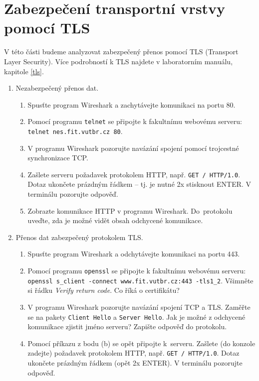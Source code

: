 \documentclass[a4paper,11pt]{article}
\begin{document}
\section{Zabezpečení transportní vrstvy pomocí TLS}
V této části budeme analyzovat zabezpečený přenos pomocí TLS (Transport Layer Security). Více podrobností k TLS najdete v laboratorním manuálu, kapitole \ref{tls}. 
\begin{enumerate}
  \item Nezabezpečený přenos dat.
    \begin{enumerate}
      \item Spusťte program Wireshark a zachytávejte komunikaci na portu 80.
      \item Pomocí programu {\tt telnet} se připojte k fakultnímu webovému
        serveru: \\ \verb|telnet nes.fit.vutbr.cz 80|.
      \item V programu Wireshark pozorujte navázání spojení pomocí trojcestné synchronizace TCP.
      \item Zašlete serveru požadavek protokolem HTTP, např. \verb|GET / HTTP/1.0|. Dotaz ukončete prázdným řádkem -- tj. je nutné 2x stisknout ENTER. V terminálu pozorujte odpověď.
      \item Zobrazte komunikace HTTP v programu Wireshark.  Do~protokolu uveďte, zda je možné vidět obsah odchycené komunikace.
    \end{enumerate}

  \item Přenos dat zabezpečený protokolem TLS.
    \begin{enumerate}
      \item Spusťte program Wireshark a odchytávejte komunikaci na portu 443.
      \item Pomocí programu {\tt openssl} se připojte k fakultnímu webovému  serveru: \\ \verb|openssl s_client -connect www.fit.vutbr.cz:443 -tls1_2|. Všimněte si řádku \emph{Verify return code}. Co říká o certifikátu?

      \item V programu Wireshark pozorujte navázání spojení TCP a TLS. Zaměřte se na pakety {\tt Client Hello} a {\tt Server Hello}. Jak je možné z odchycené komunikace zjistit jméno serveru? Zapište odpověď do protokolu.

      \item Pomocí příkazu z bodu (b) se opět připojte k~serveru. Zašlete (do konzole zadejte) požadavek protokolem HTTP, např. \verb|GET / HTTP/1.0|. Dotaz ukončete prázdným řádkem (opět 2x ENTER). V terminálu pozorujte odpověď.


\end{enumerate}
\end{enumerate}
\end{document}
